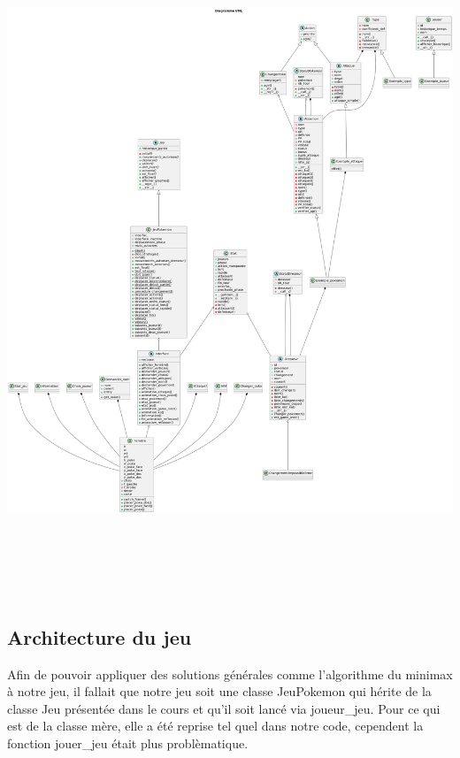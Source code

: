     \includegraphics[width=20cm,height=20cm]{images/Diagramme_UML}
        
    \subsection{Architecture du jeu}
        Afin de pouvoir appliquer des solutions générales comme l'algorithme du minimax à notre jeu, il fallait que notre jeu soit une classe JeuPokemon qui hérite de la classe Jeu présentée dans le cours et qu'il soit lancé via joueur\_jeu.
        Pour ce qui est de la classe mère, elle a été reprise tel quel dans notre code, cependent la fonction jouer\_jeu était plus problèmatique.
        
